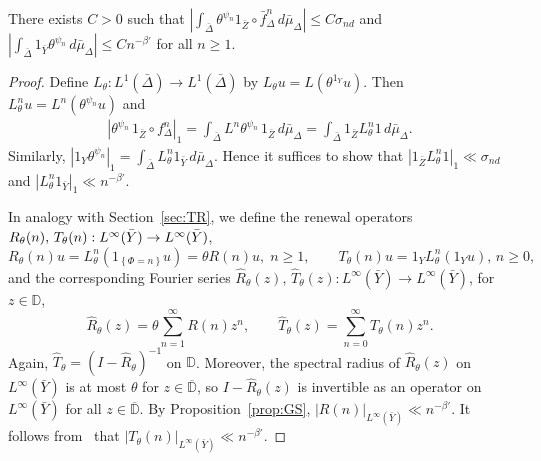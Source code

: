 \documentclass[AHL,Unicode,longabstracts,published]{cedram}
\newcommand{\D}{\mathbb{D}}
\newcommand{\hR}{\widehat{R}}
\newcommand{\hT}{\widehat{T}}
\newcommand{\barD}{\overline{\D}}
\newcommand{\bY}{\bar{Y}}
\newcommand{\bZ}{\bar{Z}}
\newcommand{\bDelta}{\bar{\Delta}}
\begin{document}
\begin{lemm}\label{lem:Ltheta}
There exists $C>0$ such that $|\int_{\bDelta} \theta^{\psi_n}1_{\bZ}\circ \bar f_\Delta^n\,d\bar\mu_\Delta|\le C \sigma_{nd}$ and $|\int_{\bDelta} 1_{\bY} \theta^{\psi_n}\,d\bar\mu_\Delta|\le C n^{-\beta'}$ for all $n\ge1$.
\end{lemm}


\begin{proof}
Define $L_\theta:L^1(\bDelta)\to L^1(\bDelta)$ by $L_\theta u=L(\theta^{1_Y} u)$. Then $L_\theta^n u=L^n(\theta^{\psi_n} u)$ and
\begin{align*}
\left|\theta^{\psi_n}\,1_{\bZ}\circ f_\Delta^n\right|_1 =\int_{\bDelta} L^n\theta^{\psi_n}\,1_{\bZ}\,d\bar\mu_\Delta =\int_{\bDelta} 1_{\bZ} L_\theta^n1\,d\bar\mu_\Delta.
\end{align*}
Similarly, $|1_Y\theta^{\psi_n}|_1 =\int_{\bDelta} L_\theta^n1_{\bY}\,d\bar\mu_\Delta$. Hence it suffices to show that $|1_{\bZ} L_\theta^n1|_1\ll \sigma_{nd}$ and $|L_\theta^n1_{\bY}|_1\ll n^{-\beta'}$.


In analogy with Section~\ref{sec:TR}, we define the renewal operators $R_\theta(n),\,T_\theta(n):L^\infty(\bY)\linebreak\to L^\infty(\bY)$,
\[
R_\theta(n)u=L_\theta^n\left(1_{\left\{\Phi=n\right\}}u\right)=\theta R(n)u,\;n\ge1,\qquad T_\theta(n)u=1_Y L_\theta^n(1_Y u),\,n\ge0,
\]
and the corresponding Fourier series $\hR_\theta(z),\,\hT_\theta(z):L^\infty(\bY)\to L^\infty(\bY)$, for $z\in\D$,
\[
\hR_\theta(z)=\theta\sum_{n=1}^\infty R(n)z^n,\qquad
\hT_\theta(z)=\sum_{n=0}^\infty T_\theta(n)z^n.
\]
Again, $\hT_\theta=(I-\hR_\theta)^{-1}$ on $\D$. Moreover, the spectral radius of $\hR_\theta(z)$ on $L^\infty(\bY)$ is at most $\theta$ for $z\in\barD$, so $I-\hR_\theta(z)$ is invertible as an operator on $L^\infty(\bY)$ for all $z\in\barD$. By Proposition~\ref{prop:GS}, ${|R(n)|}_{L^\infty(\bY)}\ll n^{-\beta'}$. It follows from~\cite[Theorem~A.3]{Gouezel05} that ${|T_\theta(n)|}_{L^\infty(\bY)}\ll n^{-\beta'}$.


\end{proof}
\end{document}

